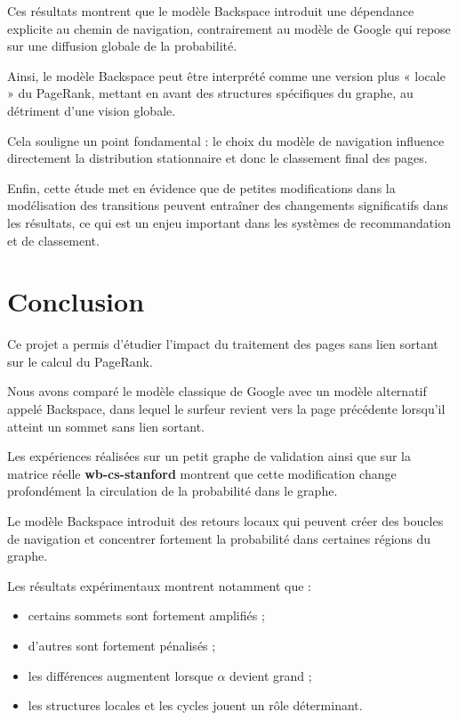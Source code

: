 \documentclass[a4paper,11pt]{article}
\begin{document}
Ces résultats montrent que le modèle Backspace introduit une dépendance explicite au chemin de navigation, contrairement au modèle de Google qui repose sur une diffusion globale de la probabilité.

Ainsi, le modèle Backspace peut être interprété comme une version plus « locale » du PageRank, mettant en avant des structures spécifiques du graphe, au détriment d’une vision globale.

Cela souligne un point fondamental : le choix du modèle de navigation influence directement la distribution stationnaire et donc le classement final des pages.

Enfin, cette étude met en évidence que de petites modifications dans la modélisation des transitions peuvent entraîner des changements significatifs dans les résultats, ce qui est un enjeu important dans les systèmes de recommandation et de classement.

\section{Conclusion}

Ce projet a permis d’étudier l’impact du traitement des pages sans lien sortant sur le calcul du PageRank.

Nous avons comparé le modèle classique de Google avec un modèle alternatif appelé Backspace, dans lequel le surfeur revient vers la page précédente lorsqu’il atteint un sommet sans lien sortant.

Les expériences réalisées sur un petit graphe de validation ainsi que sur la matrice réelle \textbf{wb-cs-stanford} montrent que cette modification change profondément la circulation de la probabilité dans le graphe.

Le modèle Backspace introduit des retours locaux qui peuvent créer des boucles de navigation et concentrer fortement la probabilité dans certaines régions du graphe.

Les résultats expérimentaux montrent notamment que :

\begin{itemize}
    \item certains sommets sont fortement amplifiés ;
    \item d’autres sont fortement pénalisés ;
    \item les différences augmentent lorsque $\alpha$ devient grand ;
    \item les structures locales et les cycles jouent un rôle déterminant.
\end{itemize}
\end{document}

